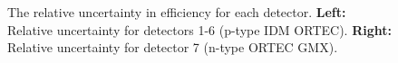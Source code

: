 \begin{figure}%
    \centering
    
    \caption{The relative uncertainty in efficiency for each detector. \textbf{Left:} Relative uncertainty for detectors 1-6 (p-type IDM ORTEC). \textbf{Right:} Relative uncertainty for detector 7 (n-type ORTEC GMX).  }%
    \label{fig:rel_uncertainty_efficiency}%
\end{figure}





